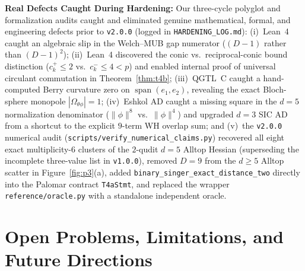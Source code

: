\documentclass[11pt,letterpaper]{article}
\theoremstyle{plain}
\theoremstyle{definition}
\theoremstyle{remark}
\newcommand{\Span}{\operatorname{span}}
\newcommand{\norm}[1]{\lVert #1 \rVert}
\newcommand{\leanref}[1]{\textnormal{\texttt{\footnotesize #1}}}
\begin{document}
\noindent\textbf{Real Defects Caught During Hardening:} Our three-cycle polyglot and formalization audits caught and eliminated genuine mathematical, formal, and engineering defects prior to \texttt{v2.0.0} (logged in \texttt{HARDENING\_LOG.md}): (i)~Lean~4 caught an algebraic slip in the Welch--MUB gap numerator ($(D-1)$ rather than $(D-1)^2$); (ii)~Lean~4 discovered the conic vs.\ reciprocal-conic bound distinction ($c_k^+\le 2$ vs.\ $c_k^-\le 4<p$) and enabled internal proof of universal circulant commutation in Theorem~\ref{thm:t4b}; (iii)~QGTL~C caught a hand-computed Berry curvature zero on $\Span(e_1,e_2)$, revealing the exact Bloch-sphere monopole $|\Omega_{\theta\phi}|=1$; (iv)~Eshkol AD caught a missing square in the $d=5$ normalization denominator ($\norm{\phi}^8$ vs.\ $\norm{\phi}^4$) and upgraded $d=3$ SIC AD from a shortcut to the explicit $9$-term WH overlap sum; and (v)~the \texttt{v2.0.0} numerical audit (\texttt{scripts/verify\_numerical\_claims.py}) recovered all eight exact multiplicity-$6$ clusters of the $2$-qudit $d=5$ Alltop Hessian (superseding the incomplete three-value list in \texttt{v1.0.0}), removed $D=9$ from the $d\ge 5$ Alltop scatter in Figure~\ref{fig:p3}(a), added \leanref{binary\_singer\_exact\_distance\_two} directly into the Palomar contract \leanref{T4aStmt}, and replaced the wrapper \texttt{reference/oracle.py} with a standalone independent oracle.

\section{Open Problems, Limitations, and Future Directions}
\label{sec:limitations}
\end{document}
